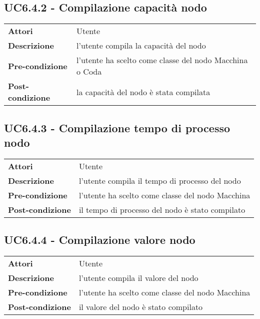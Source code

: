 \subsection{UC6.4.2 - Compilazione capacità nodo}
\label{sssec:UC6.4.2}
\def\arraystretch{1.5}
\begin{tabularx}{\textwidth}{l|p{}}
\rowcolor{I} \multicolumn{2}{c}{\color{white}\textbf{UC6.4.2 - Compilazione capacità nodo}} \\
\toprule
\endhead
\textbf{Attori} & Utente\\
\textbf{Descrizione} & l'utente compila la capacità del nodo\\
\textbf{Pre-condizione} & l'utente ha scelto come classe del nodo Macchina o Coda\\
\textbf{Post-condizione} & la capacità del nodo è stata compilata\\
\bottomrule
\end{tabularx}
\subsection{UC6.4.3 - Compilazione tempo di processo nodo}
\label{sssec:UC6.4.3}
\def\arraystretch{1.5}
\begin{tabularx}{\textwidth}{l|p{}}
\rowcolor{I} \multicolumn{2}{c}{\color{white}\textbf{UC6.4.3 - Compilazione tempo di processo nodo}} \\
\toprule
\endhead
\textbf{Attori} & Utente\\
\textbf{Descrizione} & l'utente compila il tempo di processo del nodo\\
\textbf{Pre-condizione} & l'utente ha scelto come classe del nodo Macchina\\
\textbf{Post-condizione} & il tempo di processo del nodo è stato compilato\\
\bottomrule
\end{tabularx}
\subsection{UC6.4.4 - Compilazione valore nodo}
\label{sssec:UC6.4.4}
\def\arraystretch{1.5}
\begin{tabularx}{\textwidth}{l|p{}}
\rowcolor{I} \multicolumn{2}{c}{\color{white}\textbf{UC6.4.4 - Compilazione valore nodo}} \\
\toprule
\endhead
\textbf{Attori} & Utente\\
\textbf{Descrizione} & l'utente compila il valore del nodo\\
\textbf{Pre-condizione} & l'utente ha scelto come classe del nodo Macchina\\
\textbf{Post-condizione} & il valore del nodo è stato compilato\\
\bottomrule
\end{tabularx}
